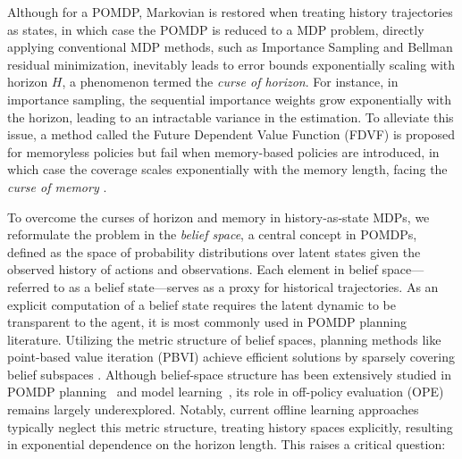 \documentclass[twoside]{article}
\newcommand{\zyh}[1]{{\color{blue}{ [\textbf{Youheng:}} #1]}}
\newcommand{\yplu}[1]{{\color{orange}{ [\textbf{Yiping:}} #1]}}
\begin{document}
Although for a POMDP, Markovian is restored when treating history trajectories as states, in which case the POMDP is reduced to a MDP problem, directly applying conventional MDP methods, such as Importance Sampling and Bellman residual minimization, inevitably leads to error bounds exponentially scaling with horizon $H$, a phenomenon termed the \textit{curse of horizon}. For instance, in importance sampling, the sequential importance weights grow exponentially with the horizon, leading to an intractable variance in the estimation. To alleviate this issue, a method called the Future Dependent Value Function (FDVF) is proposed for memoryless policies but fail when memory-based policies are introduced, in which case the coverage scales exponentially with the memory length, facing the \textit{curse of memory} \cite{zhang2024cursesfuturehistoryfuturedependent}.






To overcome the curses of horizon and memory in history‑as‑state MDPs, we reformulate the problem in the \emph{belief space}, a central concept in POMDPs, defined as the space of probability distributions over latent states given the observed history of actions and observations. Each element in belief space—referred to as a belief state—serves as a proxy for historical trajectories. As an explicit computation of a belief state requires the latent dynamic to be transparent to the agent, it is most commonly used in POMDP planning literature. Utilizing the metric structure of belief spaces, planning methods like point-based value iteration (PBVI) achieve efficient solutions by sparsely covering belief subspaces \cite{shani2013survey, lee2007makes, zhang2014covering}. 
Although belief-space structure has been extensively studied in POMDP planning~\cite{lee2007makes} and model learning~\cite{zhang2012covering}, its role in off-policy evaluation (OPE) remains largely underexplored.
 Notably, current offline learning approaches typically neglect this metric structure, treating history spaces explicitly, resulting in exponential dependence on the horizon length.
This raises a critical question:
\end{document}
